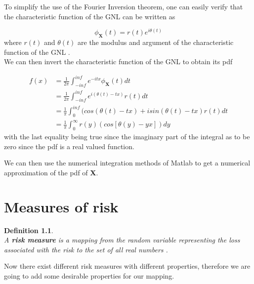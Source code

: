 \documentclass[12pt,travaildirige,nobabel, twoside]{dms}
\numberwithin{equation}{section}
\numberwithin{table}{chapter}
\numberwithin{figure}{chapter}
\newtheorem{mydef}{Definition}[section]
\begin{document}
To simplify the use of the Fourier Inversion theorem, one can easily verify that the characteristic function of the GNL can be written as

\begin{equation}
\phi_\textbf{X}(t)=r(t)e^{i\theta(t)}
\end{equation}
where $r(t)$ and $\theta(t)$ are the modulus and argument of the characteristic function of the GNL \nocite{appGNL}.\\

We can then invert the characteristic function of the GNL to obtain its pdf \nocite{returndist}


	\begin{equation}
	\begin{aligned}
		f(x)&=\frac{1}{2\pi}\int_{-inf}^{inf}e^{-itx}\phi_\textbf{X}(t)dt
		\\&=\frac{1}{2\pi}\int_{-inf}^{inf}e^{i(\theta(t)-tx)}r(t)dt
		\\&=\frac{1}{\pi}\int_{0}^{inf}(cos(\theta(t)-tx)+isin(\theta(t)-tx)r(t)dt
		\\&=\frac{1}{\pi}\int_{0}^{\infty}r(y)(cos[\theta(y)-yx])dy
		\end{aligned}
	\end{equation}
with the last equality being true since the imaginary part of the integral as to be zero since the pdf is a real valued function.

We can then use the numerical integration methods of Matlab to get a numerical approximation of the pdf of \textbf{X}.


\chapter{Measures of risk}

\begin{mydef}\leavevmode \\
A \textbf{risk measure} is a mapping from the random variable representing the loss associated with the risk to the set of all real numbers \nocite{lossmodel}.\\
\end{mydef}

Now there exist different risk measures with different properties, therefore we are going to add some desirable properties for our mapping.\\
\end{document}

